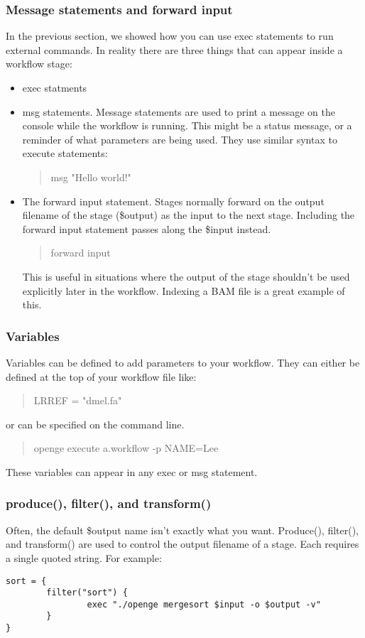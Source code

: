 \documentclass[11pt]{article}
\newcommand {\cmd}[1] {\begin{quote}#1\end{quote}}
\begin{document}
\subsubsection{Message statements and forward input}
In the previous section, we showed how you can use exec statements to run external commands. In reality there are three things that can appear inside a workflow stage:
\begin{itemize}
\item exec statments
\item msg statements. Message statements are used to print a message on the console while the workflow is running. This might be a status message, or a reminder of what parameters are being used.  They use similar syntax to execute statements:
\cmd{msg "Hello world!"}
\item The forward input statement. Stages normally forward on the output filename of the stage (\$output) as  the input to the next stage. Including the forward input statement passes along the \$input instead.
\cmd{forward input}
This is useful in situations where the output of the stage shouldn't be used explicitly later in the workflow. Indexing a BAM file is a great example of this.
\end{itemize}

\subsubsection{Variables}
Variables can be defined to add parameters to your workflow. They can either be defined at the top of your workflow file like:
\cmd{LRREF = "dmel.fa"}
or can be specified on the command line.
\cmd{openge execute a.workflow -p NAME=Lee}

These variables can appear in any exec or msg statement.

\subsubsection{produce(), filter(), and transform()}
Often, the default \$output name isn't exactly what you want. Produce(), filter(), and transform() are used to control the output filename of a stage. Each requires a single quoted string. For example:

\begin{verbatim}
sort = {
        filter("sort") {
                exec "./openge mergesort $input -o $output -v"
        }
}
\end{verbatim}
\end{document}
